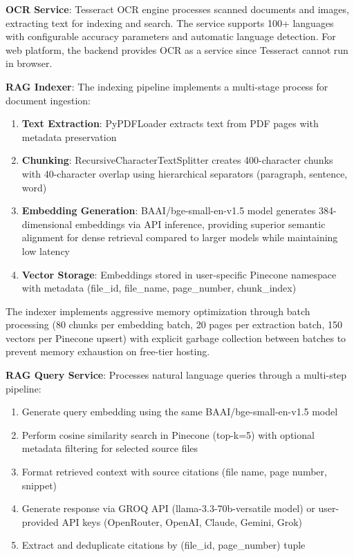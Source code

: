 \documentclass[conference]{IEEEtran}
\begin{document}
\textbf{OCR Service}: Tesseract OCR engine processes scanned documents and images, extracting text for indexing and search. The service supports 100+ languages with configurable accuracy parameters and automatic language detection. For web platform, the backend provides OCR as a service since Tesseract cannot run in browser.


\textbf{RAG Indexer}: The indexing pipeline implements a multi-stage process for document ingestion:

\begin{enumerate}
\item \textbf{Text Extraction}: PyPDFLoader extracts text from PDF pages with metadata preservation
\item \textbf{Chunking}: RecursiveCharacterTextSplitter creates 400-character chunks with 40-character overlap using hierarchical separators (paragraph, sentence, word)
\item \textbf{Embedding Generation}: BAAI/bge-small-en-v1.5 model generates 384-dimensional embeddings via API inference, providing superior semantic alignment for dense retrieval compared to larger models while maintaining low latency
\item \textbf{Vector Storage}: Embeddings stored in user-specific Pinecone namespace with metadata (file\_id, file\_name, page\_number, chunk\_index)
\end{enumerate}

The indexer implements aggressive memory optimization through batch processing (80 chunks per embedding batch, 20 pages per extraction batch, 150 vectors per Pinecone upsert) with explicit garbage collection between batches to prevent memory exhaustion on free-tier hosting.

\textbf{RAG Query Service}: Processes natural language queries through a multi-step pipeline:

\begin{enumerate}
\item Generate query embedding using the same BAAI/bge-small-en-v1.5 model
\item Perform cosine similarity search in Pinecone (top-k=5) with optional metadata filtering for selected source files
\item Format retrieved context with source citations (file name, page number, snippet)
\item Generate response via GROQ API (llama-3.3-70b-versatile model) or user-provided API keys (OpenRouter, OpenAI, Claude, Gemini, Grok)
\item Extract and deduplicate citations by (file\_id, page\_number) tuple
\end{enumerate}
\end{document}
